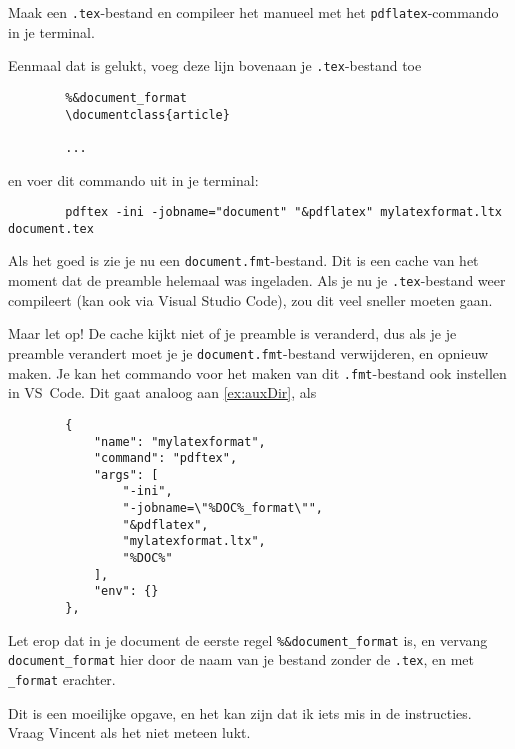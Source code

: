 \documentclass[a4paper]{article}
\begin{document}
\begin{exercise}

    Maak een \texttt{.tex}-bestand en compileer het manueel met het \texttt{pdflatex}-commando
    in je terminal.

    Eenmaal dat is gelukt, voeg deze lijn bovenaan je \texttt{.tex}-bestand toe
    \begin{verbatim}
        %&document_format
        \documentclass{article}

        ...
    \end{verbatim}
    en voer dit commando uit in je terminal:
    \begin{verbatim}
        pdftex -ini -jobname="document" "&pdflatex" mylatexformat.ltx document.tex
    \end{verbatim}

    Als het goed is zie je nu een \texttt{document.fmt}-bestand. Dit is een cache van het moment
    dat de preamble helemaal was ingeladen. Als je nu je \texttt{.tex}-bestand weer compileert
    (kan ook via Visual Studio Code), zou dit veel sneller moeten gaan.

    Maar let op! De cache kijkt niet of je preamble is veranderd, dus als je je preamble verandert
    moet je je \texttt{document.fmt}-bestand verwijderen, en opnieuw maken.
    Je kan het commando voor het maken van dit \texttt{.fmt}-bestand ook instellen in VS~Code.
    Dit gaat analoog aan \autoref{ex:auxDir}, als
    \begin{verbatim}
        {
            "name": "mylatexformat",
            "command": "pdftex",
            "args": [
                "-ini",
                "-jobname=\"%DOC%_format\"",
                "&pdflatex",
                "mylatexformat.ltx",
                "%DOC%"
            ],
            "env": {}
        },
    \end{verbatim}

    Let erop dat in je document de eerste regel \texttt{\%\&document\_format} is, en vervang \texttt{document\_format}
    hier door de naam van je bestand zonder de \texttt{.tex}, en met \texttt{\_format} erachter.

    Dit is een moeilijke opgave, en het kan zijn dat ik iets mis in de instructies. 
    Vraag Vincent als het niet meteen lukt.
\end{exercise}
\end{document}
